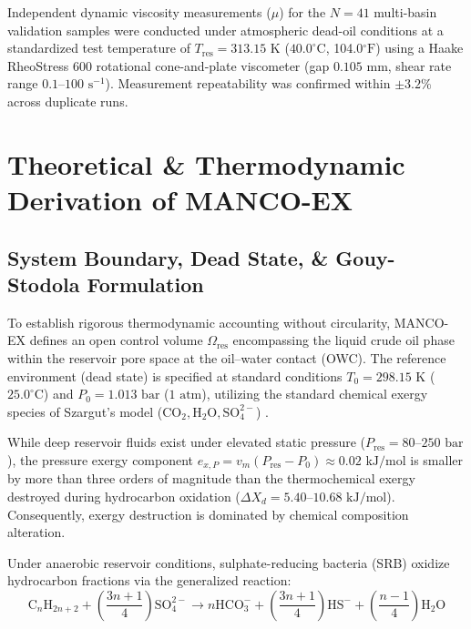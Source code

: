 \documentclass[review,12pt]{elsarticle}
\begin{document}
Independent dynamic viscosity measurements ($\mu$) for the $N=41$ multi-basin validation samples were conducted under atmospheric dead-oil conditions at a standardized test temperature of $T_{\text{res}} = 313.15\text{ K}$ ($40.0^\circ\text{C}$, 104.0$^\circ\text{F}$) using a Haake RheoStress 600 rotational cone-and-plate viscometer (gap $0.105\text{ mm}$, shear rate range $0.1\text{--}100\text{ s}^{-1}$). Measurement repeatability was confirmed within $\pm 3.2\%$ across duplicate runs.

\section{Theoretical \& Thermodynamic Derivation of MANCO-EX}

\subsection{System Boundary, Dead State, \& Gouy-Stodola Formulation}
To establish rigorous thermodynamic accounting without circularity, MANCO-EX defines an open control volume $\Omega_{\text{res}}$ encompassing the liquid crude oil phase within the reservoir pore space at the oil--water contact (OWC). The reference environment (dead state) is specified at standard conditions $T_0 = 298.15\text{ K}$ ($25.0^\circ\text{C}$) and $P_0 = 1.013\text{ bar}$ ($1\text{ atm}$), utilizing the standard chemical exergy species of Szargut's model ($\text{CO}_2, \text{H}_2\text{O}, \text{SO}_4^{2-}$) \citep{szargut1988exergy, dincer2021exergy}. 

While deep reservoir fluids exist under elevated static pressure ($P_{\text{res}} = 80\text{--}250\text{ bar}$), the pressure exergy component $e_{x,P} = v_m(P_{\text{res}} - P_0) \approx 0.02\text{ kJ/mol}$ is smaller by more than three orders of magnitude than the thermochemical exergy destroyed during hydrocarbon oxidation ($\Delta X_d = 5.40\text{--}10.68\text{ kJ/mol}$). Consequently, exergy destruction is dominated by chemical composition alteration.

Under anaerobic reservoir conditions, sulphate-reducing bacteria (SRB) oxidize hydrocarbon fractions via the generalized reaction:
\begin{equation}
    \text{C}_n\text{H}_{2n+2} + \left( \frac{3n+1}{4} \right) \text{SO}_4^{2-} \longrightarrow n\text{HCO}_3^- + \left( \frac{3n+1}{4} \right) \text{HS}^- + \left( \frac{n-1}{4} \right) \text{H}_2\text{O}
\end{equation}
\end{document}
